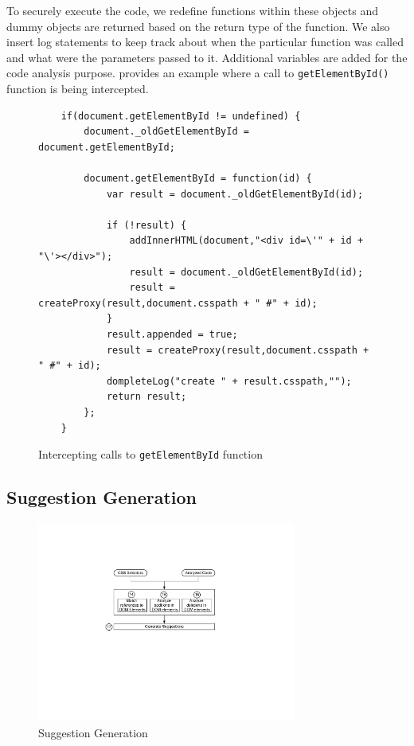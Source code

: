 			To securely execute the \javascript code, we redefine functions within these objects and dummy objects are returned based on the return type of the function. We also insert log statements to keep track about when the particular function was called and what were the parameters passed to it. Additional variables are added for the code analysis purpose.  provides an example where a call to \texttt{getElementById()} function is being intercepted.
			
			
			\begin{figure}
			\medskip
			\begin{lstlisting}
	if(document.getElementById != undefined) { 
		document._oldGetElementById = document.getElementById; 
			
		document.getElementById = function(id) { 
			var result = document._oldGetElementById(id); 
				
			if (!result) { 
				addInnerHTML(document,"<div id=\'" + id + "\'></div>"); 
				result = document._oldGetElementById(id); 
				result = createProxy(result,document.csspath + " #" + id); 
			} 
			result.appended = true;
			result = createProxy(result,document.csspath + " #" + id);
			dompleteLog("create " + result.csspath,"");
			return result; 
		}; 
	}
			\end{lstlisting}
			\caption{Intercepting calls to \texttt{getElementById} function}
			\label{Fig:Environment}
			\end{figure}
	
	\subsection{Suggestion Generation}
	\label{Sec:Suggestions}
		\begin{figure}
			\centering
			\includegraphics[width=85mm]{images/suggestions.pdf}
			\caption{Suggestion Generation}
			\label{Fig:Suggestions}
		\end{figure}